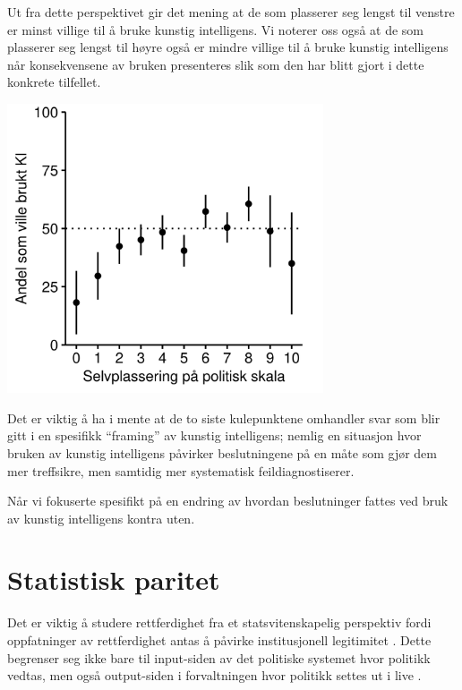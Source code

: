 \documentclass[
]{book}
\begin{document}
Ut fra dette perspektivet gir det mening at de som plasserer seg lengst til venstre er minst villige til å bruke kunstig intelligens.
Vi noterer oss også at de som plasserer seg lengst til høyre også er mindre villige til å bruke kunstig intelligens når konsekvensene av bruken presenteres slik som den har blitt gjort i dette konkrete tilfellet.

\includegraphics[width=0.7\textwidth,height=\textheight]{figs/png/fig_relval_polscale.png}

Det er viktig å ha i mente at de to siste kulepunktene omhandler svar som blir gitt i en spesifikk ``framing'' av kunstig intelligens; nemlig en situasjon hvor bruken av kunstig intelligens påvirker beslutningene på en måte som gjør dem mer treffsikre, men samtidig mer systematisk feildiagnostiserer.

Når vi fokuserte spesifikt på en endring av hvordan beslutninger fattes ved bruk av kunstig intelligens kontra uten.

\hypertarget{paritet}{%
\chapter{Statistisk paritet}\label{paritet}}

Det er viktig å studere rettferdighet fra et statsvitenskapelig perspektiv fordi oppfatninger av rettferdighet antas å påvirke institusjonell legitimitet \citep{tyler2003procedural}.
Dette begrenser seg ikke bare til input-siden av det politiske systemet hvor politikk vedtas, men også output-siden i forvaltningen hvor politikk settes ut i live \citep{krislov2012representative, rosanvallon2011democratic, rothstein2009creating}.
\end{document}
